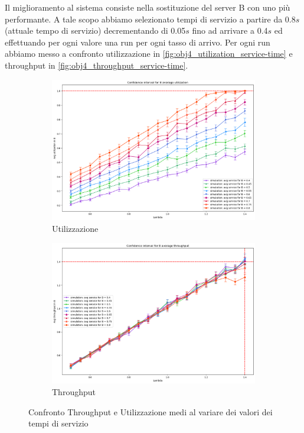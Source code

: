 Il miglioramento al sistema consiste nella sostituzione del server B con uno più performante. A tale scopo abbiamo selezionato tempi di servizio a partire da 0.8$s$ (attuale tempo di servizio) decrementando di 0.05$s$ fino ad arrivare a 0.4$s$ ed effettuando per ogni valore una run per ogni tasso di arrivo. Per ogni run abbiamo messo a confronto utilizzazione in \autoref{fig:obj4_utilization_service-time} e throughput in \autoref{fig:obj4_throughput_service-time}.
\begin{figure}
    \centering
    \begin{subfigure}{1\linewidth}
        \centering
        \includegraphics[width=0.8\columnwidth]{figs/results/obj4/obj4-utilization-service-time.png}
        \caption{Utilizzazione}
        \label{fig:obj4_utilization_service-time}
    \end{subfigure}
    \hfill
    \begin{subfigure}{1\linewidth}
        \centering
        \includegraphics[width=0.8\columnwidth]{figs/results/obj4/obj4-throughput-service-time.png}
        \caption{Throughput}
        \label{fig:obj4_throughput_service-time}
    \end{subfigure}
    \caption{Confronto Throughput e Utilizzazione medi al variare dei valori dei tempi di servizio}
    \label{fig:obj4-service-time-comparison}
\end{figure}


